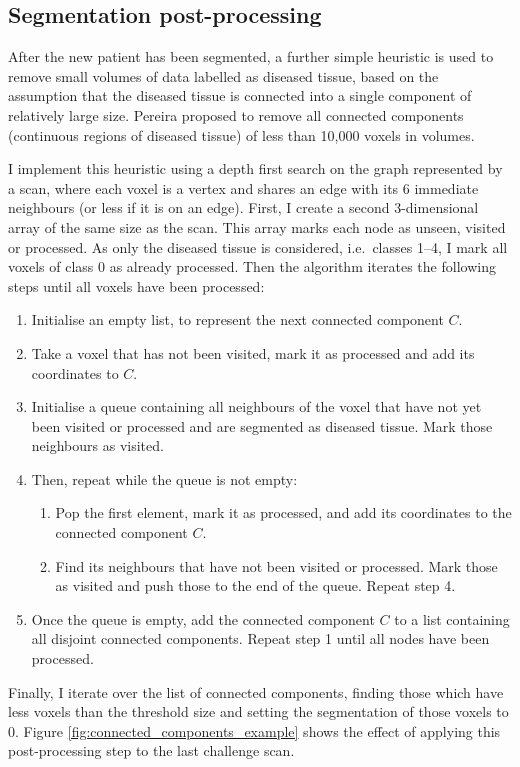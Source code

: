 \documentclass[12pt,a4paper,twoside,openright]{report}
\begin{document}
\subsection{Segmentation post-processing}
After the new patient has been segmented, a further simple heuristic is used to remove small volumes of data labelled as diseased tissue, based on the assumption that the diseased tissue is connected into a single component of relatively large size. Pereira \cite{pereira} proposed to remove all connected components (continuous regions of diseased tissue) of less than 10,000 voxels in volumes.

I implement this heuristic using a depth first search on the graph represented by a scan, where each voxel is a vertex and shares an edge with its 6 immediate neighbours (or less if it is on an edge). First, I create a second 3-dimensional array of the same size as the scan. This array marks each node as unseen, visited or processed. As only the diseased tissue is considered, i.e.\ classes 1--4, I mark all voxels of class 0 as already processed. Then the algorithm iterates the following steps until all voxels have been processed:
\begin{enumerate}
	\item Initialise an empty list, to represent the next connected component $C$.
	\item Take a voxel that has not been visited, mark it as processed and add its coordinates to $C$.
	\item Initialise a queue containing all neighbours of the voxel that have not yet been visited or processed and are segmented as diseased tissue. Mark those neighbours as visited.
	\item Then, repeat while the queue is not empty:
	\begin{enumerate}
		\item Pop the first element, mark it as processed, and add its coordinates to the connected component $C$.
		\item Find its neighbours that have not been visited or processed. Mark those as visited and push those to the end of the queue. Repeat step 4.
	\end{enumerate}
	\item Once the queue is empty, add the connected component $C$ to a list containing all disjoint connected components. Repeat step 1 until all nodes have been processed.
\end{enumerate}
Finally, I iterate over the list of connected components, finding those which have less voxels than the threshold size and setting the segmentation of those voxels to 0. Figure \ref{fig:connected_components_example} shows the effect of applying this post-processing step to the last challenge scan.
\end{document}
